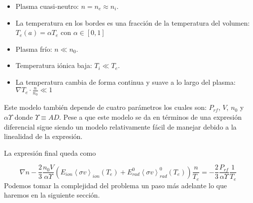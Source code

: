   \begin{itemize}
    \item Plasma cuasi-neutro: $n = n_e \approx n_i$.
    \item La temperatura en los bordes es una fracci\'on de la temperatura del volumen: $T_e(a) = \alpha T_e$ con $\alpha \in [0,1]$
    \item Plasma fr\'io: $n \ll n_0$.
    \item Temperatura i\'onica baja: $T_i \ll T_e$.
    \item La temperatura cambia de forma continua y suave a lo largo del plasma: $\nabla T_e \cdot \frac{n}{n_0} \ll 1$
  \end{itemize}

  Este modelo tambi\'en depende de cuatro par\'ametros los cuales son: $P_{rf}$, $V$, $n_0$ y $\alpha\varUpsilon$ donde $\varUpsilon \equiv A D$. Pese a que este modelo se da en t\'erminos de una expresi\'on diferencial sigue siendo un modelo relativamente f\'acil de manejar debido a la linealidad de la expresi\'on. 

  La expresi\'on final queda como 

  \begin{equation}
    \nabla n - \frac{2}{3}\frac{n_0 V}{\alpha \varUpsilon}\left(  E_{ion}\left<\sigma v\right>_{ion}(T_e) + E_{rad}^0\left<\sigma v\right>_{rad}^0(T_e)\right)\frac{n}{T_e} = - \frac{2}{3}\frac{P_{rf}}{\alpha \varUpsilon}\frac{1}{T_e}
  \end{equation}
  Podemos tomar la complejidad del problema un paso m\'as adelante lo que haremos en la siguiente secci\'on.
